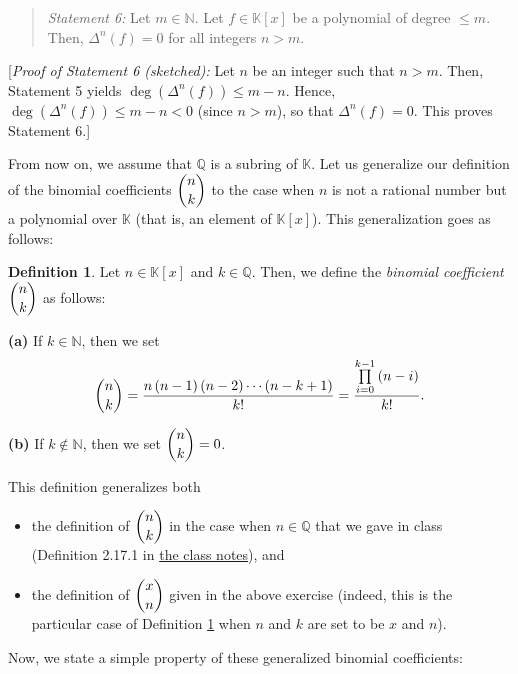 \documentclass[paper=a4, fontsize=12pt]{scrartcl}%
\let\prodnonlimits\prod
\renewcommand{\prod}{\prodnonlimits\limits}
\theoremstyle{plainsl}
\theoremstyle{definition}
\newtheorem{definition}[theorem]{Definition}
\theoremstyle{remark}
\newenvironment{statement}{\begin{quote}}{\end{quote}}
\begin{document}
\begin{statement}
\textit{Statement 6:} Let $m\in\mathbb{N}$. Let $f\in\mathbb{K}\left[
x\right]  $ be a polynomial of degree $\leq m$. Then, $\Delta^{n}\left(
f\right)  =0$ for all integers $n>m$.
\end{statement}

[\textit{Proof of Statement 6 (sketched):} Let $n$ be an integer such that
$n>m$. Then, Statement 5 yields $\deg\left(  \Delta^{n}\left(  f\right)
\right)  \leq m-n$. Hence, $\deg\left(  \Delta^{n}\left(  f\right)  \right)
\leq m-n<0$ (since $n>m$), so that $\Delta^{n}\left(  f\right)  =0$. This
proves Statement 6.]

\bigskip

From now on, we assume that $\mathbb{Q}$ is a subring of $\mathbb{K}$. Let us
generalize our definition of the binomial coefficients $\dbinom{n}{k}$ to the
case when $n$ is not a rational number but a polynomial over $\mathbb{K}$
(that is, an element of $\mathbb{K}\left[  x\right]  $). This generalization
goes as follows:

\begin{definition}
\label{def.pol.general-binom}Let $n\in\mathbb{K}\left[  x\right]  $
and $k\in\mathbb{Q}$. Then, we define the \textit{binomial coefficient}
$\dbinom{n}{k}$ as follows:

\textbf{(a)} If $k\in\mathbb{N}$, then we set
\[
\dbinom{n}{k}=\dfrac{n\left(  n-1\right)  \left(  n-2\right)  \cdots\left(
n-k+1\right)  }{k!}=\dfrac{\prod_{i=0}^{k-1}\left(  n-i\right)  }{k!}.
\]


\textbf{(b)} If $k\notin\mathbb{N}$, then we set $\dbinom{n}{k}=0$.
\end{definition}

This definition generalizes both

\begin{itemize}
\item the definition of $\dbinom{n}{k}$ in the case when $n\in\mathbb{Q}$ that
we gave in class (Definition 2.17.1 in
\href{http://www.cip.ifi.lmu.de/~grinberg/t/19s/notes.pdf}{the class notes}), and

\item the definition of $\dbinom{x}{n}$ given in the above exercise (indeed,
this is the particular case of Definition \ref{def.pol.general-binom} when $n$
and $k$ are set to be $x$ and $n$).
\end{itemize}

Now, we state a simple property of these generalized binomial coefficients:
\end{document}
